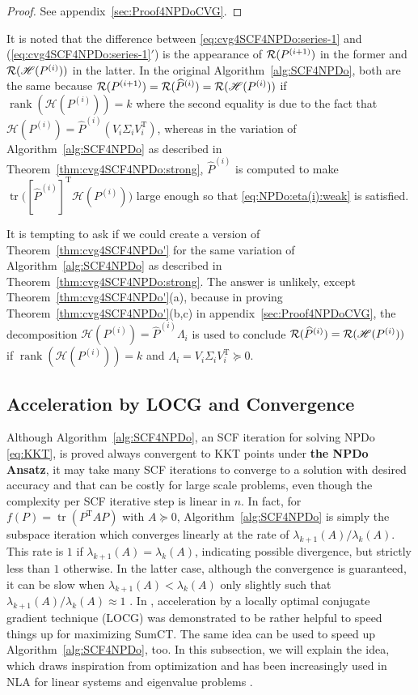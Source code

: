 \documentclass[11pt]{article}
\def\scrH{\mathscr{H}}
\def\cR{{\cal R}}
\def\what{\widehat}
\DeclareMathOperator{\rank}{rank}
\DeclareMathOperator{\tr}{tr}
\DeclareMathOperator{\T}{T}
\theoremstyle{definition}
\numberwithin{equation}{section}
\begin{document}
\begin{proof}
See appendix~\ref{sec:Proof4NPDoCVG}.
\end{proof}

It is noted that the difference between \eqref{eq:cvg4SCF4NPDo:series-1} and
(\ref{eq:cvg4SCF4NPDo:series-1}$'$) is the appearance of $\cR(P^{(i+1)})$ in the former and
$\cR(\scrH(P^{(i)}))$ in the latter. In the original Algorithm~\ref{alg:SCF4NPDo}, both are the same
because $\cR(P^{(i+1)})=\cR(\what P^{(i)})=\cR(\scrH(P^{(i)}))$ if $\rank(\scrH(P^{(i)}))=k$ where the second equality
is due to the fact that $\scrH(P^{(i)})=\what P^{(i)}(V_i\Sigma_iV_i^{\T})$, whereas
in the variation of Algorithm~\ref{alg:SCF4NPDo} as described in
Theorem~\ref{thm:cvg4SCF4NPDo:strong}, $\what P^{(i)}$ is computed to make $\tr\big([\what P^{(i)}]^{\T}\scrH(P^{(i)})\big)$
large enough so that \eqref{eq:NPDo:eta(i):weak} is satisfied.

It is tempting to ask if we could create a version of Theorem~\ref{thm:cvg4SCF4NPDo'} for the same
variation of Algorithm~\ref{alg:SCF4NPDo} as described in Theorem~\ref{thm:cvg4SCF4NPDo:strong}.
The answer is unlikely, except Theorem~\ref{thm:cvg4SCF4NPDo'}(a), because in proving
Theorem~\ref{thm:cvg4SCF4NPDo'}(b,c) in appendix~\ref{sec:Proof4NPDoCVG}, the decomposition
$\scrH(P^{(i)})=\what P^{(i)}\Lambda_i$ is used to conclude $\cR(\what P^{(i)})=\cR(\scrH(P^{(i)}))$
if $\rank(\scrH(P^{(i)}))=k$
and $\Lambda_i=V_i\Sigma_iV_i^{\T}\succeq 0$.


\subsection{Acceleration by LOCG and Convergence}\label{ssec:LOCG:NPD}
Although  Algorithm~\ref{alg:SCF4NPDo}, an SCF iteration for solving
NPDo \eqref{eq:KKT}, is proved always convergent to KKT points under {\bf the NPDo Ansatz},
it may take many SCF iterations to converge to a solution with desired accuracy and
that can be costly for large scale problems, even though the complexity per SCF iterative step is linear in $n$. In fact, for $f(P)=\tr(P^{\T}AP)$ with $A\succeq 0$, Algorithm~\ref{alg:SCF4NPDo}
is simply the subspace iteration which converges
linearly at the rate of $\lambda_{k+1}(A)/\lambda_k(A)$. This rate is $1$  if $\lambda_{k+1}(A)=\lambda_k(A)$, indicating possible divergence, but strictly less than $1$ otherwise. In the latter case, although the convergence is guaranteed,
it can be slow when $\lambda_{k+1}(A)<\lambda_k(A)$ only slightly such that $\lambda_{k+1}(A)/\lambda_k(A)\approx 1$ \cite{demm:1997,govl:2013}.
In \cite{wazl:2022a}, acceleration by a locally optimal conjugate gradient technique (LOCG) was demonstrated
to be rather helpful to speed things up for maximizing SumCT. The same idea can be used to speed up
Algorithm~\ref{alg:SCF4NPDo}, too.
In this subsection, we will explain the idea, which draws inspiration from optimization \cite{poly:1987,taka:1965} and has been
increasingly used in NLA for linear systems and eigenvalue problems \cite{beli:2022,imlz:2016,knya:2001,li:2015,yali:2021}.
\end{document}
